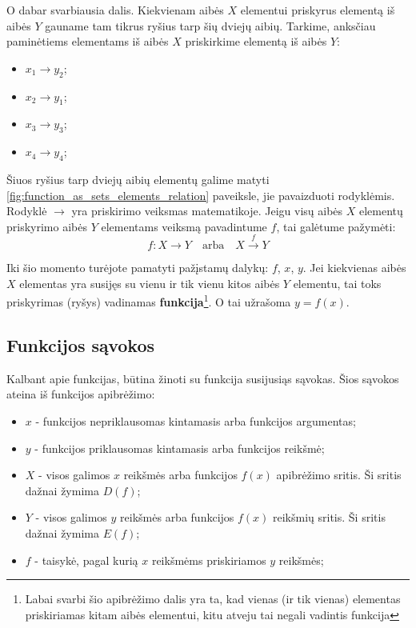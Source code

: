 \documentclass{tufte-handout}
\begin{document}
O dabar svarbiausia dalis. Kiekvienam aibės $X$ elementui priskyrus elementą iš
aibės $Y$ gauname tam tikrus ryšius tarp šių dviejų aibių. Tarkime, anksčiau
paminėtiems elementams iš aibės $X$ priskirkime elementą iš aibės $Y$:
\begin{itemize}
  \item $x_1 \rightarrow y_2$;
  \item $x_2 \rightarrow y_1$;
  \item $x_3 \rightarrow y_3$;
  \item $x_4 \rightarrow y_4$;
\end{itemize}

Šiuos ryšius tarp dviejų aibių elementų galime matyti
\ref{fig:function_as_sets_elements_relation} paveiksle, jie pavaizduoti
rodyklėmis. Rodyklė $\rightarrow$ yra priskirimo veiksmas matematikoje. Jeigu
visų aibės $X$ elementų priskyrimo aibės $Y$ elementams veiksmą pavadintume
$f$, tai galėtume
pažymėti:
$$ f: X \rightarrow Y  \quad\text{arba}\quad  X \xrightarrow{f} Y$$

Iki šio momento turėjote pamatyti pažįstamų dalykų: $f$, $x$, $y$. Jei
kiekvienas aibės $X$ elementas yra susijęs su vienu ir tik vienu kitos aibės
$Y$ elementu, tai toks priskyrimas (ryšys) vadinamas
\textbf{funkcija}\footnote{Labai
  svarbi šio apibrėžimo dalis yra ta, kad vienas (ir tik vienas) elementas
  priskiriamas kitam aibės elementui, kitu atveju tai negali vadintis
  funkcija}. O tai užrašoma $y=f(x)$.

\subsection{Funkcijos sąvokos}\label{sec:function_related_defintions}

Kalbant apie funkcijas, būtina žinoti su funkcija susijusiąs sąvokas. Šios
sąvokos ateina iš funkcijos apibrėžimo:

\begin{itemize}
  \item $x$ - funkcijos nepriklausomas kintamasis arba funkcijos argumentas;
  \item $y$ - funkcijos priklausomas kintamasis arba funkcijos reikšmė;
  \item $X$ - visos galimos $x$ reikšmės arba funkcijos $f(x)$ apibrėžimo
        sritis. Ši sritis dažnai žymima $D(f)$;
  \item $Y$ - visos galimos $y$ reikšmės arba funkcijos $f(x)$ reikšmių sritis.
        Ši sritis dažnai žymima $E(f)$;
  \item $f$ - taisykė, pagal kurią $x$ reikšmėms priskiriamos $y$ reikšmės;
\end{itemize}
\end{document}
